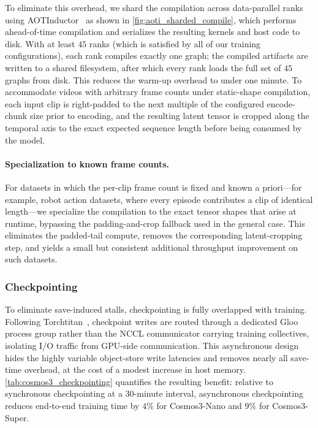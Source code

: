 To eliminate this overhead, we shard the compilation across data-parallel ranks using AOTInductor~\citep{pytorch_aot_inductor} as shown in \cref{fig:aoti_sharded_compile}, which performs ahead-of-time compilation and serializes the resulting kernels and host code to disk. With at least $45$ ranks (which is satisfied by all of our training configurations), each rank compiles exactly one graph; the compiled artifacts are written to a shared filesystem, after which every rank loads the full set of $45$ graphs from disk. This reduces the warm-up overhead to under one minute. To accommodate videos with arbitrary frame counts under static-shape compilation, each input clip is right-padded to the next multiple of the configured encode-chunk size prior to encoding, and the resulting latent tensor is cropped along the temporal axis to the exact expected sequence length before being consumed by the model.

\paragraph{Specialization to known frame counts.}

For datasets in which the per-clip frame count is fixed and known a priori---for example, robot action datasets, where every episode contributes a clip of identical length---we specialize the compilation to the exact tensor shapes that arise at runtime, bypassing the padding-and-crop fallback used in the general case. This eliminates the padded-tail compute, removes the corresponding latent-cropping step, and yields a small but consistent additional throughput improvement on such datasets.

\subsubsection{Checkpointing}

To eliminate save-induced stalls, checkpointing is fully overlapped with training. Following Torchtitan~\citep{torchtitan}, checkpoint writes are routed through a dedicated Gloo process group rather than the NCCL communicator carrying training collectives, isolating I/O traffic from GPU-side communication. This asynchronous design hides the highly variable object-store write latencies and removes nearly all save-time overhead, at the cost of a modest increase in host memory. \cref{tab:cosmos3_checkpointing} quantifies the resulting benefit: relative to synchronous checkpointing at a 30-minute interval, asynchronous checkpointing reduces end-to-end training time by $4\%$ for Cosmos3-Nano and $9\%$ for Cosmos3-Super.

